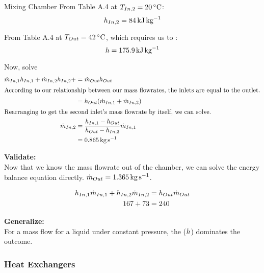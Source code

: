 \begin{example}{Mixing Chamber}
  From Table A.4 at $\Temp_{In, 2} = \SI{20}{\degreeCelsius}$:
  \begin{equation*}
    h_{In, 2} = \SI{84}{\kilo\joule\per\kilo\gram}
  \end{equation*}

  From Table A.4 at $\Temp_{Out} = \SI{42}{\degreeCelsius}$, which requires us to :
  \begin{equation*}
    h = \SI{175.9}{\kilo\joule\per\kilo\gram}
  \end{equation*}

  Now, solve
  \begin{align*}
    \dot{m}_{In, 1} h_{In, 1} + \dot{m}_{In, 2} h_{In, 2} + &= \dot{m}_{Out} h_{Out} \\
    \intertext{According to our relationship between our mass flowrates, the inlets are equal to the outlet.}
                                                                                                              &= h_{Out} (\dot{m}_{In, 1} + \dot{m}_{In, 2}) \\
    \intertext{Rearranging to get the second inlet's mass flowrate by itself, we can solve.}
    \dot{m}_{In, 2} &= \frac{h_{In, 1} - h_{Out}}{h_{Out} - h_{In, 2}} \dot{m}_{In, 1} \\
                                                                                                              &= \SI{0.865}{\kilo\gram\per\second}
  \end{align*}

  \textbf{Validate:} \\
  Now that we know the mass flowrate out of the chamber, we can solve the energy balance equation directly.
  $\dot{m}_{Out} = \SI{1.365}{\kilo\gram\per\second}$.

  \begin{align*}
    h_{In, 1} \dot{m}_{In, 1} + h_{In, 2} \dot{m}_{In, 2} &= h_{Out} \dot{m}_{Out} \\
    167 + 73 &= 240
  \end{align*}

  \textbf{Generalize:} \\
  For a mass flow for a liquid under constant pressure, the  ($h$) dominates the outcome.
\end{example}

\subsubsection{Heat Exchangers}\label{subsubsec:Heat_Exchangers}
